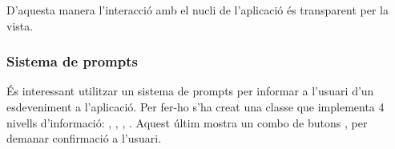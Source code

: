 \documentclass[letterpaper,11pt,catalan]{sphinxmanual}
\begin{document}
\begin{sphinxVerbatim}[commandchars=\\\{\}]
 
\end{sphinxVerbatim}

D'aquesta manera l'interacció amb el nucli de l'aplicació és transparent per la vista.


\subsubsection{Sistema de prompts}
\label{\detokenize{index:sistema-de-prompts}}
És interessant utilitzar un sistema de prompts per informar a l'usuari d'un esdeveniment
a l'aplicació. Per fer-ho s'ha creat una classe que implementa 4 nivells d'informació:
, , , . Aquest últim mostra un combo
de butons ,  per demanar confirmació a l'usuari.
\end{document}
